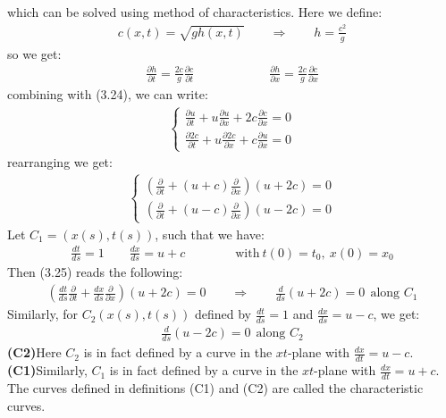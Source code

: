 \documentclass[11pt]{book}
\theoremstyle{break}
\theoremstyle{break}
\begin{document}
which can be solved using method of characteristics. Here we define:
\begin{align*}
c(x,t) = \sqrt{gh(x,t)} \qquad \Rightarrow \qquad h = \frac{c^2}{g}
\end{align*}
so we get:
\begin{align*}
\frac{\partial h}{\partial t} = \frac{2c }{g}\frac{\partial c}{\partial t} \qquad\qquad\qquad \frac{\partial h}{\partial x} = \frac{2c }{g}\frac{\partial c}{\partial x}
\end{align*}
combining with (3.24), we can write:
\begin{align*}
\begin{cases}
\frac{\partial u}{\partial t} + u \frac{\partial u}{\partial x} + 2c \frac{\partial c}{\partial x} = 0  \\
\frac{\partial 2c}{\partial t} + u \frac{\partial 2c}{\partial x} + c \frac{\partial u}{\partial x} = 0
\end{cases}
\end{align*}
rearranging we get:
\begin{align}
\begin{cases}
\left(\frac{\partial}{\partial t} + (u+c)\frac{\partial}{\partial x}\right)(u+2c)=0\\
\left(\frac{\partial }{\partial t}+(u-c) \frac{\partial }{\partial x}\right)(u-2c) = 0
\end{cases}
\end{align}
Let $C_1 = (x(s), t(s))$, such that we have:
\begin{align*}
\frac{dt}{ds} = 1 \qquad \frac{dx}{ds} = u+c \qquad\qquad \text{with}\ t(0) = t_0, \ x(0) = x_0
\end{align*}
Then (3.25) reads the following:
\begin{align}
\left(\frac{d t}{d s}\frac{\partial}{\partial t} + \frac{d x}{d s}\frac{\partial }{\partial x} \right)(u+2c) = 0 \qquad \Rightarrow \qquad \frac{d}{ds}(u+2c) = 0 \ \ \text{along }C_1
\end{align}
Similarly, for $C_2(x(s), t(s))$ defined by $\frac{dt}{ds} = 1$ and $\frac{dx}{ds} = u-c$, we get:
\begin{align}
\frac{d}{ds}(u - 2c) = 0 \ \ \text{along }C_2
\end{align}
\textbf{(C2)}\quad Here $C_2$ is in fact defined by a curve in the $xt$-plane with $\frac{dx}{dt} = u-c$.\\
\textbf{(C1)}\quad Similarly, $C_1$ is in fact defined by a curve in the $xt$-plane with $\frac{dx}{dt} = u+c$. \\
The curves defined in definitions (C1) and (C2) are called the characteristic curves. \\
\end{document}
